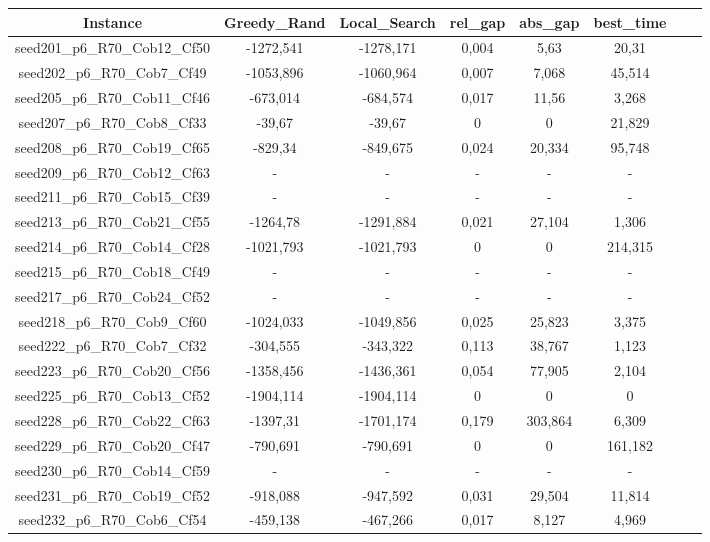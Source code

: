 \documentclass[a4paper]{article}
\begin{document}
\begin{center}
\begin{longtable}{cccccccc}
\tabularnewline
\hline
Instance & Greedy\_Rand & Local\_Search & rel\_gap & abs\_gap & best\_time\\
\hline
seed201\_p6\_R70\_Cob12\_Cf50 & -1272,541 & -1278,171 & 0,004 & 5,63 & 20,31\\
\hline
seed202\_p6\_R70\_Cob7\_Cf49 & -1053,896 & -1060,964 & 0,007 & 7,068 & 45,514\\
\hline
seed205\_p6\_R70\_Cob11\_Cf46 & -673,014 & -684,574 & 0,017 & 11,56 & 3,268\\
\hline
seed207\_p6\_R70\_Cob8\_Cf33 & -39,67 & -39,67 & 0 & 0 & 21,829\\
\hline
seed208\_p6\_R70\_Cob19\_Cf65 & -829,34 & -849,675 & 0,024 & 20,334 & 95,748\\
\hline
seed209\_p6\_R70\_Cob12\_Cf63 & - & - & - & - & -\\
\hline
seed211\_p6\_R70\_Cob15\_Cf39 & - & - & - & - & -\\
\hline
seed213\_p6\_R70\_Cob21\_Cf55 & -1264,78 & -1291,884 & 0,021 & 27,104 & 1,306\\
\hline
seed214\_p6\_R70\_Cob14\_Cf28 & -1021,793 & -1021,793 & 0 & 0 & 214,315\\
\hline
seed215\_p6\_R70\_Cob18\_Cf49 & - & - & - & - & -\\
\hline
seed217\_p6\_R70\_Cob24\_Cf52 & - & - & - & - & -\\
\hline
seed218\_p6\_R70\_Cob9\_Cf60 & -1024,033 & -1049,856 & 0,025 & 25,823 & 3,375\\
\hline
seed222\_p6\_R70\_Cob7\_Cf32 & -304,555 & -343,322 & 0,113 & 38,767 & 1,123\\
\hline
seed223\_p6\_R70\_Cob20\_Cf56 & -1358,456 & -1436,361 & 0,054 & 77,905 & 2,104\\
\hline
seed225\_p6\_R70\_Cob13\_Cf52 & -1904,114 & -1904,114 & 0 & 0 & 0\\
\hline
seed228\_p6\_R70\_Cob22\_Cf63 & -1397,31 & -1701,174 & 0,179 & 303,864 & 6,309\\
\hline
seed229\_p6\_R70\_Cob20\_Cf47 & -790,691 & -790,691 & 0 & 0 & 161,182\\
\hline
seed230\_p6\_R70\_Cob14\_Cf59 & - & - & - & - & -\\
\hline
seed231\_p6\_R70\_Cob19\_Cf52 & -918,088 & -947,592 & 0,031 & 29,504 & 11,814\\
\hline
seed232\_p6\_R70\_Cob6\_Cf54 & -459,138 & -467,266 & 0,017 & 8,127 & 4,969\\

\end{longtable}
\end{center}
\end{document}
